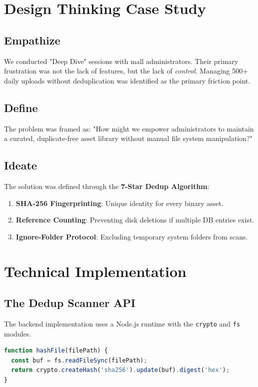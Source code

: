 \documentclass[12pt,a4paper]{report}
\begin{document}
\chapter{Design Thinking Case Study}
\section{Empathize}
We conducted "Deep Dive" sessions with mall administrators. Their primary frustration was not the lack of features, but the lack of \textit{control}. Managing 500+ daily uploads without deduplication was identified as the primary friction point.

\section{Define}
The problem was framed as: "How might we empower administrators to maintain a curated, duplicate-free asset library without manual file system manipulation?"

\section{Ideate}
The solution was defined through the \textbf{7-Star Dedup Algorithm}:
\begin{enumerate}
    \item \textbf{SHA-256 Fingerprinting}: Unique identity for every binary asset.
    \item \textbf{Reference Counting}: Preventing disk deletions if multiple DB entries exist.
    \item \textbf{Ignore-Folder Protocol}: Excluding temporary system folders from scans.
\end{enumerate}

\chapter{Technical Implementation}
\section{The Dedup Scanner API}
The backend implementation uses a Node.js runtime with the \texttt{crypto} and \texttt{fs} modules.
\begin{lstlisting}[language=JavaScript, caption=SHA-256 Implementation]
function hashFile(filePath) {
  const buf = fs.readFileSync(filePath);
  return crypto.createHash('sha256').update(buf).digest('hex');
}
\end{lstlisting}
\end{document}
